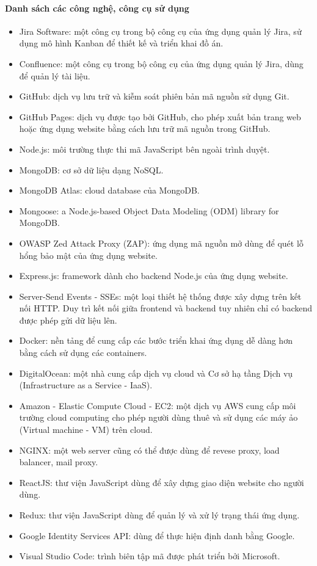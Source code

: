 \paragraph{Danh sách các công nghệ, công cụ sử dụng}
\begin{itemize}
    \item Jira Software: một công cụ trong bộ công cụ của ứng dụng quản lý Jira, sử dụng mô hình Kanban để thiết kế và triển khai đồ án.
    \item Confluence: một công cụ trong bộ công cụ của ứng dụng quản lý Jira, dùng để quản lý tài liệu.
    \item GitHub: dịch vụ lưu trữ và kiễm soát phiên bản mã nguồn sử dụng Git.
    \item GitHub Pages: dịch vụ được tạo bởi GitHub, cho phép xuất bản trang web hoặc ứng dụng website bằng cách lưu trữ mã nguồn trong GitHub.
    \item Node.js: môi trường thực thi mã JavaScript bên ngoài trình duyệt.
    \item MongoDB: cơ sở dữ liệu dạng NoSQL.
    \item MongoDB Atlas: cloud database của MongoDB.
    \item Mongoose: a Node.js-based Object Data Modeling (ODM) library for MongoDB.
    \item OWASP Zed Attack Proxy (ZAP): ứng dụng mã nguồn mở dùng để quét lỗ hổng bảo mật của ứng dụng website.
    \item Express.js: framework dành cho backend Node.js của ứng dụng website.
    \item Server-Send Events - SSEs: một loại thiết hệ thống được xây dựng trên kết nối HTTP. Duy trì kết nối giữa frontend và backend tuy nhiên chỉ có backend được phép gửi dữ liệu lên.
    \item Docker: nền tảng để cung cấp các bước triển khai ứng dụng dễ dàng hơn bằng cách sử dụng các containers.
    \item DigitalOcean: một nhà cung cấp dịch vụ cloud và Cơ sở hạ tầng Dịch vụ (Infrastructure as a Service - IaaS).
    \item Amazon - Elastic Compute Cloud - EC2: một dịch vụ AWS cung cấp môi trường cloud computing cho phép người dùng thuê và sử dụng các máy ảo (Virtual machine - VM) trên cloud.
    \item NGINX: một web server cũng có thể được dùng để revese proxy, load balancer, mail proxy.
    \item ReactJS: thư viện JavaScript dùng để xây dựng giao diện website cho người dùng.
    \item Redux: thư viện JavaScript dùng để quản lý và xử lý trạng thái ứng dụng.
    \item Google Identity Services API: dùng để thực hiện định danh bằng Google.
    \item Visual Studio Code: trình biên tập mã được phát triển bởi Microsoft.
\end{itemize}